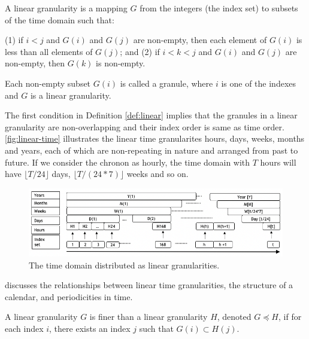 \documentclass[12pt]{article}
\begin{document}
\begin{definition}\label{def:linear}
A linear granularity is a mapping $G$ from the integers (the index set) to subsets of the time domain such that:

  (1) if $i < j$ and $G(i)$ and $G(j)$ are non-empty, then each element of $G(i)$ is less
than all elements of $G(j)$; and
  (2) if $i < k < j$ and $G(i)$ and $G(j)$ are non-empty, then $G(k)$ is non-empty.
\end{definition}

\begin{definition}[Granule]\label{def:granule}
Each non-empty subset $G(i)$ is called a granule, where $i$ is one of the indexes and $G$ is a linear granularity.
\end{definition}

The first condition in Definition \ref{def:linear} implies that the granules in a linear granularity are non-overlapping and their index order is same as time order. \autoref{fig:linear-time} illustrates the linear time granularites hours, days, weeks, months and years, each of which are non-repeating in nature and arranged from past to future. If we consider the chronon \citep[see][]{aigner2011visualization} as hourly, the time domain with \(T\) hours will have \(\lfloor T/24\rfloor\) days, \(\lfloor T/(24*7)\rfloor\) weeks and so on.

\begin{figure}

{\centering \includegraphics[width=1\linewidth]{Figs/linear-arr} 

}

\caption{The time domain distributed as linear granularities.}\label{fig:linear-time}
\end{figure}

\citet{Bettini1998-ed} discusses the relationships between linear time granularities, the structure of a calendar, and periodicities in time.

\begin{definition}\label{def:finerthan}
A linear granularity $G$ is finer than a linear granularity $H$, denoted $G \preceq H$, if for each index $i$, there exists an index $j$ such that $G(i) \subset H(j)$.
\end{definition}
\end{document}
